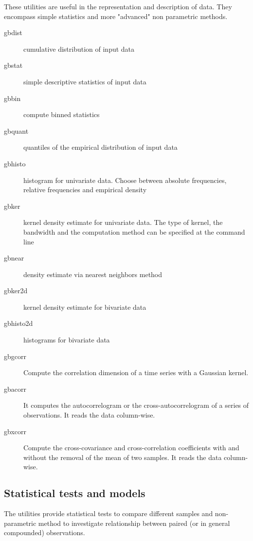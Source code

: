 \documentclass[11pt]{article}
\begin{document}
These utilities are useful in the representation and description of
data. They encompass simple statistics and more "advanced" non
parametric methods.


\begin{description}
\item[{gbdist}] cumulative distribution of input data

\item[{gbstat}] simple descriptive statistics of input data

\item[{gbbin}] compute binned statistics

\item[{gbquant}] quantiles of the empirical distribution of input data

\item[{gbhisto}] histogram for univariate data. Choose between absolute
frequencies, relative frequencies and empirical density

\item[{gbker}] kernel density estimate for univariate data. The type of
kernel, the bandwidth and the computation method can be
specified at the command line

\item[{gbnear}] density estimate via nearest neighbors method

\item[{gbker2d}] kernel density estimate for bivariate data

\item[{gbhisto2d}] histograms for bivariate data

\item[{gbgcorr}] Compute the correlation dimension of a time series with a
Gaussian kernel.

\item[{gbacorr}] It computes the autocorrelogram or the
cross-autocorrelogram of a series of observations. It
reads the data column-wise.

\item[{gbxcorr}] Compute the cross-covariance and cross-correlation
coefficients with and without the removal of the mean of
two samples. It reads the data column-wise.
\end{description}
\subsection{Statistical tests and models}
\label{sec-1-4}

The utilities provide statistical tests to compare different samples
and non-parametric method to investigate relationship between paired
(or in general compounded) observations.
\end{document}
